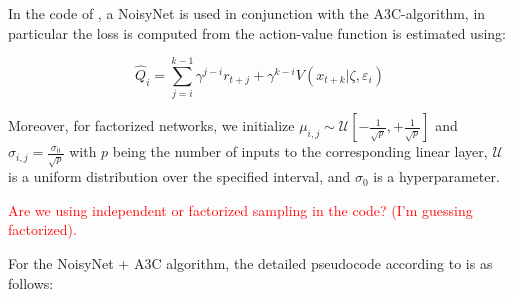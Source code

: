 \noindent In the code of \cite{rle-paper}, a NoisyNet is used in conjunction with the A3C-algorithm, in particular the loss is computed from the action-value function is estimated using:

\begin{equation}
  \hat{Q}_{i} = \sum_{j=i}^{k-1} \gamma^{j-i} r_{t+j} + \gamma^{k-i} V(x_{t+k} | \zeta, \varepsilon_{i})
\end{equation}

Moreover, for factorized networks, we initialize $\mu_{i,j} \sim \mathcal{U}\left[-\frac{1}{\sqrt{p}}, +\frac{1}{\sqrt{p}}\right]$ and $\sigma_{i,j} = \frac{\sigma_{0}}{\sqrt{p}}$ with $p$ being the number of inputs to the corresponding linear layer, $\mathcal{U}$ is a uniform distribution over the specified interval, and $\sigma_{0}$ is a hyperparameter.

\textcolor{red}{Are we using independent or factorized sampling in the code? (I'm guessing factorized).}

\noindent For the NoisyNet + A3C algorithm, the detailed pseudocode according to \cite{noisynet-paper} is as follows:

